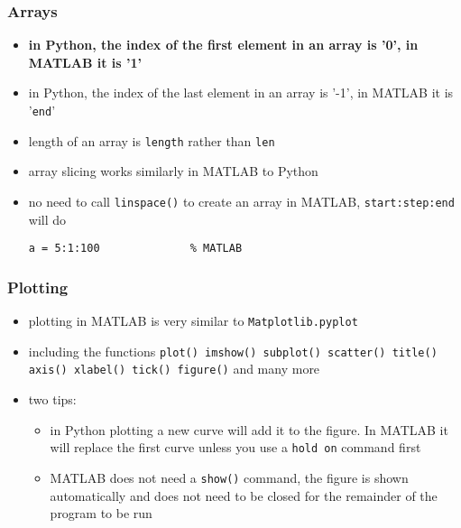 \documentclass[english,14pt]{beamer}
\begin{document}
\begin{frame}[fragile]

\frametitle{Arrays}

	\begin{itemize}
		\item \textbf{in Python, the index of the first element in an array is '0', in MATLAB it is '1'}
		\item in Python, the index of the last element in an array is '-1', in MATLAB it is '\texttt{end}'
		\item length of an array is \texttt{length} rather than \texttt{len}
		\item array slicing works similarly in MATLAB to Python
            \item no need to call \texttt{linspace()} to create an array in MATLAB,  \texttt{start:step:end} will do
\begin{lstlisting}[style=MStyle]
a = 5:1:100              % MATLAB
\end{lstlisting}
	\end{itemize}
\end{frame}


\begin{frame}[fragile]

\frametitle{Plotting}

\begin{itemize}       
	\item plotting in MATLAB is very similar to \texttt{Matplotlib.pyplot}
	\item including the functions \texttt{plot() imshow() subplot() scatter() title() axis() xlabel() tick() figure()} and many more
	\item two tips:
	\begin{itemize}
		\item in Python plotting a new curve will add it to the figure. In MATLAB it will replace the first curve unless you use a \texttt{hold on} command first
		\item MATLAB does not need a \texttt{show()} command, the figure is shown automatically and does not need to be closed for the remainder of the program to be run
    \end{itemize}
\end{itemize}
\end{frame}
\end{document}
